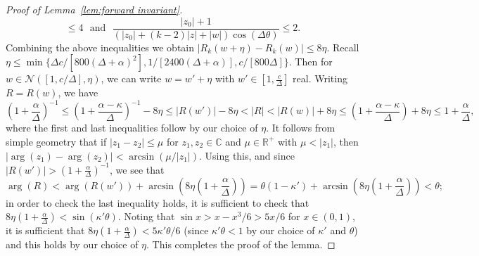 \documentclass[10pt,a4paper]{article}
\theoremstyle{definition}
\begin{document}
\begin{proof}[Proof of Lemma~\ref{lem:forward invariant}]
\[\leq 4
 \:\:\:\text{and}\:\:\:
\frac{|z_0| +  1}{(|z_0| + (k-2)|z| + |w|)\cos(\Delta \theta)}
\leq 2.
\]
Combining the above inequalities we obtain $|R_k(w + \eta) - R_k(w)| \leq 8 \eta$. Recall $\eta \leq \min\{\Delta c / [800(\Delta + \alpha)^2], 1/[2400(\Delta+ \alpha)], c / [800 \Delta]\}$.
Then for $w\in \mathcal{N}([1,c/\Delta],\eta)$, we can write $w = w' + \eta$ with $w' \in [1,  \frac{c}{\Delta}]$ real. Writing $R = R(w)$, we have 
\[\left( 1 + \frac{\alpha}{\Delta} \right)^{-1}
\leq \left( 1 + \frac{\alpha - \kappa}{\Delta} \right)^{-1} - 8\eta
\leq |R(w')| - 8\eta
<|R| < |R(w)| + 8\eta 
\leq \left( 1 + \frac{\alpha - \kappa}{\Delta} \right) + 8\eta
\leq 
1 + \frac{\alpha}{\Delta},
\]
where the first and last inequalities follow by our choice of $\eta$.
%
It follows from simple geometry that if $|z_1 - z_2| \leq \mu$ for $z_1, z_2 \in \mathbb{C}$ and $\mu \in \mathbb{R}^+$ with $\mu < |z_1|$, then $|\arg(z_1) - \arg(z_2)| < \arcsin(\mu / |z_1|)$. Using this, and since $|R(w')|> (1 + \frac{\alpha}{\Delta})^{-1}$, we see that 
\[
\arg(R) < \arg(R(w')) + \arcsin\left( 8 \eta \left(1 + \frac{\alpha}{\Delta} \right) \right) = \theta(1 - \kappa')  + \arcsin\left( 8 \eta \left(1 + \frac{\alpha}{\Delta} \right) \right) < \theta;
\]
in order to check the last inequality holds, it is sufficient 
to check that $8 \eta (1 + \frac{\alpha}{\Delta}) < \sin(\kappa' \theta)$. 
Noting that $\sin x > x - x^3/6 > 5x/6$ for $x \in (0,1)$, 
it is sufficient that $ 8 \eta (1 + \frac{\alpha}{\Delta}) < 5\kappa'\theta / 6 $ (since $\kappa' \theta <1$ by our choice of $\kappa'$ and $\theta$) and this holds by our choice of $\eta$. This completes the proof of the lemma.
\end{proof}
%
\end{document}
